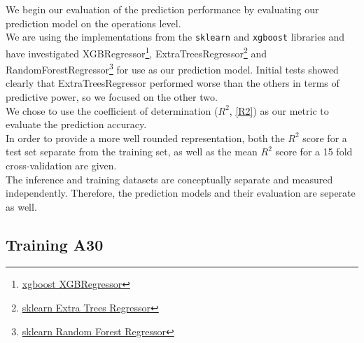 We begin our evaluation of the prediction performance by evaluating our prediction model on the operations level. \\
We are using the implementations from the \texttt{sklearn} and \texttt{xgboost} libraries and have investigated XGBRegressor\footnote{\href{https://xgboost.readthedocs.io/en/latest/python/index.html}{xgboost XGBRegressor} }, ExtraTreesRegressor\footnote{\href{https://scikit-learn.org/stable/modules/generated/sklearn.ensemble.ExtraTreesRegressor.html}{sklearn Extra Trees Regressor} } and RandomForestRegressor\footnote{\href{https://scikit-learn.org/stable/modules/generated/sklearn.ensemble.RandomForestRegressor.html}{sklearn Random Forest Regressor} } for use as our prediction model. Initial tests showed clearly that ExtraTreesRegressor performed worse than the others in terms of predictive power, so we focused on the other two. \\
We chose to use the coefficient of determination ($R^2$, \ref{R2}) as our metric to evaluate the prediction accuracy. \\
In order to provide a more well rounded representation, both the $R^2$ score for a test set separate from the training set, as well as the mean $R^2$ score for a 15 fold cross-validation are given. \\
The inference and training datasets are conceptually separate and measured independently. Therefore, the prediction models and their evaluation are seperate as well.










\subsection{Training A30}



